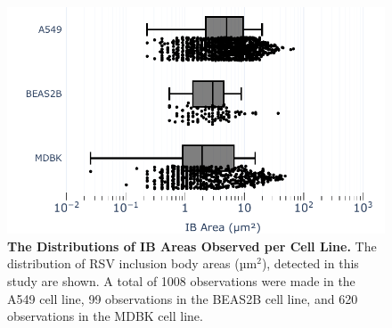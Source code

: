 \begin{figure}
    \centering
    \includegraphics[width=1\linewidth]{08. Chapter 3/Figs/01. Localisation introduction/06. box-infection.pdf}
    \caption[The Distributions of IB Areas Observed per Cell Line.]{\textbf{The Distributions of IB Areas Observed per Cell Line.} The distribution of RSV inclusion body areas (\(\mbox{µm}^2\)), detected in this study are shown. A total of 1008 observations were made in the A549 cell line, 99 observations in the BEAS2B cell line, and 620 observations in the MDBK cell line.}
    \label{fig:The Distributions of IB Areas Observed Per Cell Line}
\end{figure}